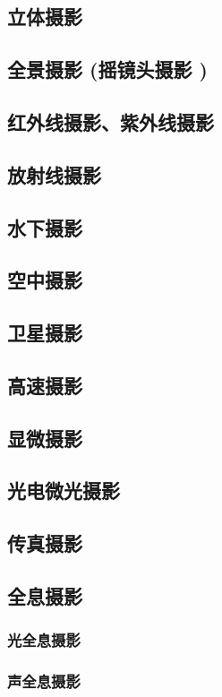 \documentclass[UTF8]{../../ApplicationUniverse}
\begin{document}
    \subsection{立体摄影}
    \subsection{全景摄影 (摇镜头摄影 )}
    \subsection{红外线摄影、紫外线摄影}
    \subsection{放射线摄影}
    \subsection{水下摄影}
    \subsection{空中摄影}
    \subsection{卫星摄影}
    \subsection{高速摄影}
    \subsection{显微摄影}
    \subsection{光电微光摄影}
    \subsection{传真摄影}
    \subsection{全息摄影}
        \subsubsection{光全息摄影}
        \subsubsection{声全息摄影}
\end{document}
